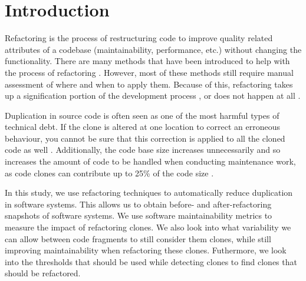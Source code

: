 \chapter{Introduction}
\label{ch:introduction}
Refactoring is the process of restructuring code to improve quality related attributes of a codebase (maintainability, performance, etc.) without changing the functionality. There are many methods that have been introduced to help with the process of refactoring \cite{fowler2018refactoring, wake2004refactoring}. However, most of these methods still require manual assessment of where and when to apply them. Because of this, refactoring takes up a signification portion of the development process \cite{lientz1978characteristics, mens2004survey}, or does not happen at all \cite{mens2003refactoring}. %

Duplication in source code is often seen as one of the most harmful types of technical debt. If the clone is altered at one location to correct an erroneous behaviour, you cannot be sure that this correction is applied to all the cloned code as well \cite{ostberg2014automatically}. Additionally, the code base size increases unnecessarily and so increases the amount of code to be handled when conducting maintenance work, as code clones can contribute up to 25\% of the code size \cite{bruntink2005use}.

In this study, we use refactoring techniques to automatically reduce duplication in software systems. This allows us to obtain before- and after-refactoring snapshots of software systems. We use software maintainability metrics to measure the impact of refactoring clones. We also look into what variability we can allow between code fragments to still consider them clones, while still improving maintainability when refactoring these clones. Futhermore, we look into the thresholds that should be used while detecting clones to find clones that should be refactored.

